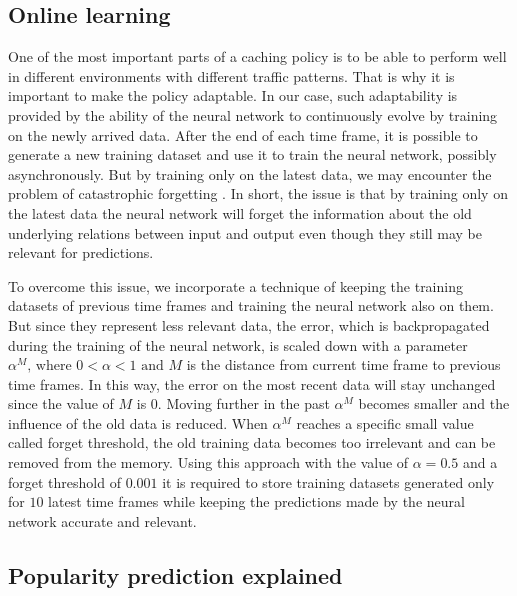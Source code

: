 \subsection{Online learning} \label{online_learning}

One of the most important parts of a caching policy is to be able to perform well in different environments with different traffic patterns. That is why it is important to make the policy adaptable. In our case, such adaptability is provided by the ability of the neural network to continuously evolve by training on the newly arrived data. After the end of each time frame, it is possible to generate a new training dataset and use it to train the neural network, possibly asynchronously. But by training only on the latest data, we may encounter the problem of catastrophic forgetting \cite{16, 17}. In short, the issue is that by training only on the latest data the neural network will forget the information about the old underlying relations between input and output even though they still may be relevant for predictions. 

To overcome this issue, we incorporate a technique of keeping the training datasets of previous time frames and training the neural network also on them. But since they represent less relevant data, the error, which is backpropagated during the training of the neural network, is scaled down with a parameter $\alpha^M \text{, where } 0 < \alpha < 1 \text{ and } M$ is the distance from current time frame to previous time frames. In this way, the error on the most recent data will stay unchanged since the value of $M$ is $0$. Moving further in the past $\alpha^M$ becomes smaller and the influence of the old data is reduced. When $\alpha^M$ reaches a specific small value called forget threshold, the old training data becomes too irrelevant and can be removed from the memory. Using this approach with the value of $\alpha = 0.5$ and a forget threshold of $0.001$ it is required to store training datasets generated only for $10$ latest time frames while keeping the predictions made by the neural network accurate and relevant.

\subsection{Popularity prediction explained} \label{pop_prediction_explained}

